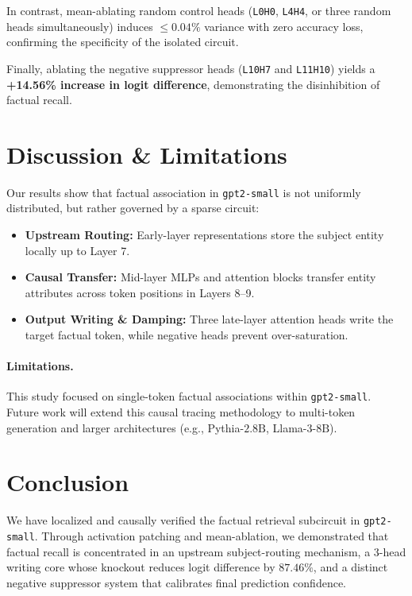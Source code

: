 \documentclass[10pt,twocolumn,letterpaper]{article}
\begin{document}
In contrast, mean-ablating random control heads (\texttt{L0H0}, \texttt{L4H4}, or three random heads simultaneously) induces $\le 0.04\%$ variance with zero accuracy loss, confirming the specificity of the isolated circuit.

Finally, ablating the negative suppressor heads (\texttt{L10H7} and \texttt{L11H10}) yields a \textbf{+14.56\% increase in logit difference}, demonstrating the disinhibition of factual recall.

\section{Discussion \& Limitations}
Our results show that factual association in \texttt{gpt2-small} is not uniformly distributed, but rather governed by a sparse circuit:
\begin{itemize}
    \item \textbf{Upstream Routing:} Early-layer representations store the subject entity locally up to Layer 7.
    \item \textbf{Causal Transfer:} Mid-layer MLPs and attention blocks transfer entity attributes across token positions in Layers 8--9.
    \item \textbf{Output Writing \& Damping:} Three late-layer attention heads write the target factual token, while negative heads prevent over-saturation.
\end{itemize}

\paragraph{Limitations.} This study focused on single-token factual associations within \texttt{gpt2-small}. Future work will extend this causal tracing methodology to multi-token generation and larger architectures (e.g., Pythia-$2.8\text{B}$, Llama-3-$8\text{B}$).

\section{Conclusion}
We have localized and causally verified the factual retrieval subcircuit in \texttt{gpt2-small}. Through activation patching and mean-ablation, we demonstrated that factual recall is concentrated in an upstream subject-routing mechanism, a 3-head writing core whose knockout reduces logit difference by $87.46\%$, and a distinct negative suppressor system that calibrates final prediction confidence.



\end{document}
